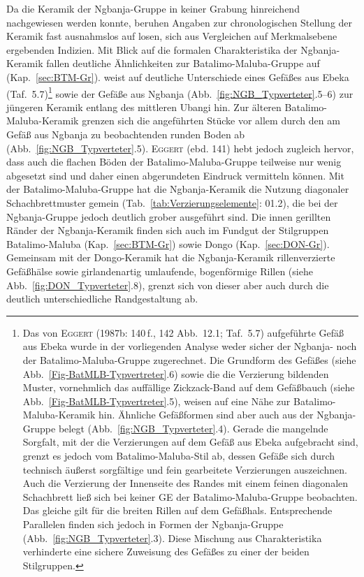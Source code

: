 Da die Keramik der \mbox{Ngbanja}-Gruppe in keiner Grabung hinreichend nachgewiesen werden konnte, beruhen Angaben zur chronologischen Stellung der Keramik fast ausnahmslos auf losen, sich aus Vergleichen auf Merkmalsebene ergebenden Indizien. Mit Blick auf die formalen Charakteristika der \mbox{Ngbanja}-Keramik fallen deutliche Ähnlichkeiten zur Batalimo-Maluba-Gruppe auf (Kap.~\ref{sec:BTM-Gr}). \textcite[140\,f.]{Eggert.1987c} weist auf deutliche Unterschiede eines Gefäßes aus Ebeka (Taf.~5.7)\footnote{Das von \textsc{Eggert} (1987b: 140\,f., 142 Abb.~12.1; Taf.~5.7) aufgeführte Gefäß aus Ebeka wurde in der vorliegenden Analyse weder sicher der \mbox{Ngbanja}- noch der Batalimo-Maluba-Gruppe zugerechnet. Die Grundform des Gefäßes (siehe Abb.~\ref{Fig-BatMLB-Typvertreter}.6) sowie die die Verzierung bildenden Muster, vornehmlich das auffällige Zickzack-Band auf dem Gefäßbauch (siehe Abb.~\ref{Fig-BatMLB-Typvertreter}.5), weisen auf eine Nähe zur Batalimo-Maluba-Keramik hin. Ähnliche Gefäßformen sind aber auch aus der \mbox{Ngbanja}-Gruppe belegt (Abb.~\ref{fig:NGB_Typverteter}.4). Gerade die mangelnde Sorgfalt, mit der die Verzierungen auf dem Gefäß aus Ebeka aufgebracht sind, grenzt es jedoch vom Batalimo-Maluba-Stil ab, dessen Gefäße sich durch technisch äußerst sorgfältige und fein gearbeitete Verzierungen auszeichnen. Auch die Verzierung der Innenseite des Randes mit einem feinen diagonalen Schachbrett ließ sich bei keiner GE der Batalimo-Maluba-Gruppe beobachten. Das gleiche gilt für die breiten Rillen auf dem Gefäßhals. Entsprechende Parallelen finden sich jedoch in Formen der \mbox{Ngbanja}-Gruppe (Abb.~\ref{fig:NGB_Typverteter}.3). Diese Mischung aus Charakteristika verhinderte eine sichere Zuweisung des Gefäßes zu einer der beiden Stilgruppen.\label{ftn:BTM-NGB-Unterschiede}} sowie der Gefäße aus \mbox{Ngbanja} (Abb.~\ref{fig:NGB_Typverteter}.5--6) zur jüngeren Keramik entlang des mittleren \mbox{Ubangi} hin. Zur älteren Batalimo-Maluba-Keramik grenzen sich die angeführten Stücke vor allem durch den am Gefäß aus \mbox{Ngbanja} zu beobachtenden runden Boden ab (Abb.~\ref{fig:NGB_Typverteter}.5). \textsc{Eggert} (ebd. 141) hebt jedoch zugleich hervor, dass auch die flachen Böden der Batalimo-Maluba-Gruppe teilweise nur wenig abgesetzt sind und daher einen abgerundeten Eindruck vermitteln können. Mit der Batalimo-Maluba-Gruppe hat die \mbox{Ngbanja}-Keramik die Nutzung diagonaler Schachbrettmuster gemein (Tab.~\ref{tab:Verzierungselemente}: 01.2), die bei der \mbox{Ngbanja}-Gruppe jedoch deutlich grober ausgeführt sind. Die innen gerillten Ränder der \mbox{Ngbanja}-Keramik finden sich auch im Fundgut der Stilgruppen Batalimo-Maluba (Kap.~\ref{sec:BTM-Gr}) sowie Dongo (Kap.~\ref{sec:DON-Gr}). Gemeinsam mit der Dongo-Keramik hat die \mbox{Ngbanja}-Keramik rillenverzierte Gefäßhälse sowie girlandenartig umlaufende, bogenförmige Rillen (siehe Abb.~\ref{fig:DON_Typverteter}.8), grenzt sich von dieser aber auch durch die deutlich unterschiedliche Randgestaltung ab.

